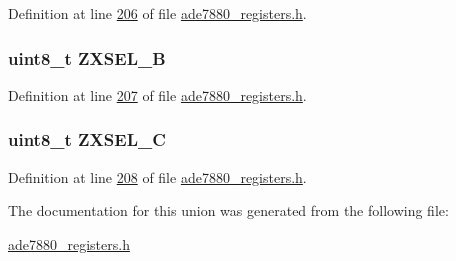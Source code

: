 Definition at line \hyperlink{a00036_source_l00206}{206} of file \hyperlink{a00036_source}{ade7880\-\_\-registers.\-h}.

\hypertarget{a00026_a2b7940d1ad2b70ed4644b6bac2288f2d}{
\subsubsection[{Z\-X\-S\-E\-L\-\_\-\-B}]{\setlength{\rightskip}{0pt plus 5cm}uint8\-\_\-t Z\-X\-S\-E\-L\-\_\-\-B}}\label{d6/d5b/a00026_a2b7940d1ad2b70ed4644b6bac2288f2d}


Definition at line \hyperlink{a00036_source_l00207}{207} of file \hyperlink{a00036_source}{ade7880\-\_\-registers.\-h}.

\hypertarget{a00026_a4104c2c769740a5468325bff44e8eb02}{
\subsubsection[{Z\-X\-S\-E\-L\-\_\-\-C}]{\setlength{\rightskip}{0pt plus 5cm}uint8\-\_\-t Z\-X\-S\-E\-L\-\_\-\-C}}\label{d6/d5b/a00026_a4104c2c769740a5468325bff44e8eb02}


Definition at line \hyperlink{a00036_source_l00208}{208} of file \hyperlink{a00036_source}{ade7880\-\_\-registers.\-h}.



The documentation for this union was generated from the following file\-:\begin{DoxyCompactItemize}
\item 
\hyperlink{a00036}{ade7880\-\_\-registers.\-h}\end{DoxyCompactItemize}
